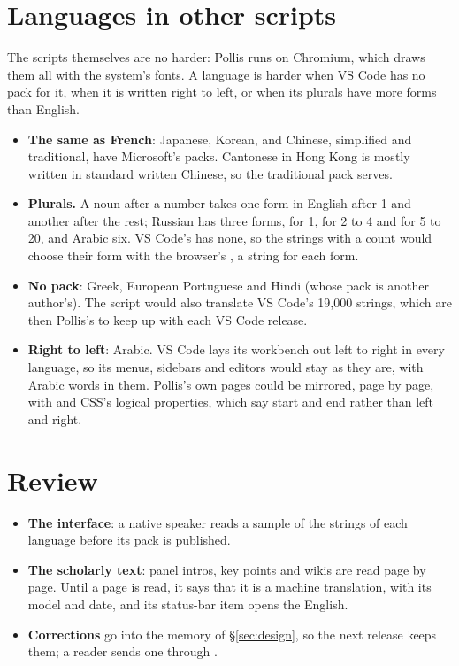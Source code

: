 \section{Languages in other scripts}\label{sec:scripts}
The scripts themselves are no harder: Pollis runs on Chromium, which draws them all with the system's fonts. A
language is harder when VS Code has no pack for it, when it is written right to left, or when its plurals have more
forms than English.
\begin{itemize}
  \item \textbf{The same as French}: Japanese, Korean, and Chinese, simplified and traditional, have Microsoft's
    packs. Cantonese in Hong Kong is mostly written in standard written Chinese, so the traditional pack serves.
  \item \textbf{Plurals.} A noun after a number takes one form in English after 1 and another after the rest; Russian has
    three forms, for 1, for 2 to 4 and for 5 to 20, and Arabic six. VS Code's
     has none, so the strings with a count would choose their form with the browser's
    , a string for each form.
  \item \textbf{No pack}: Greek, European Portuguese and Hindi (whose pack is another author's). The script would also
    translate VS Code's 19,000 strings, which are then Pollis's to keep up with each VS Code release.
  \item \textbf{Right to left}: Arabic. VS Code lays its workbench out left to right in every language, so its menus,
    sidebars and editors would stay as they are, with Arabic words in them. Pollis's own pages could be mirrored, page
    by page, with  and CSS's logical properties, which say start and end rather than left and right.
\end{itemize}

\section{Review}\label{sec:review}
\begin{itemize}
  \item \textbf{The interface}: a native speaker reads a sample of the strings of each language before its pack is
    published.
  \item \textbf{The scholarly text}: panel intros, key points and wikis are read page by page. Until a page is read, it
    says that it is a machine translation, with its model and date, and its status-bar item opens the English.
  \item \textbf{Corrections} go into the memory of \S\ref{sec:design}, so the next release keeps them; a reader sends
    one through .
\end{itemize}


